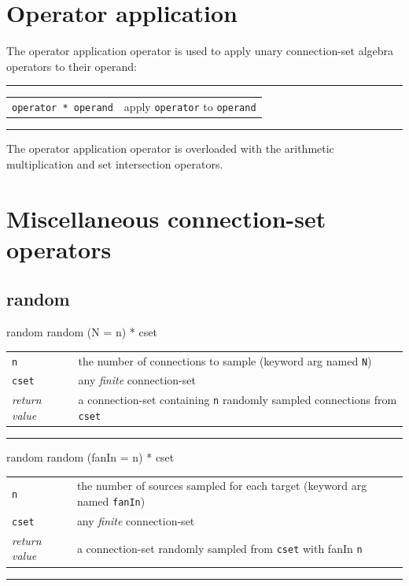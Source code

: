 \documentclass[a4paper,twoside]{report}
\makeatletter
\newenvironment{parameters}%
{\begin{tabular}{@{\hspace{2em}}lp{0.6\textwidth}}}%
{\end{tabular}\par\vspace{1mm}\par\hrule\par\vspace{5mm}}
\newcommand{\fa}[1]{\lstinline|#1|}
\newcommand{\expr}[1]{\lstinline|#1|}
\newcommand{\ret}{\emph{return value}}
\makeatother
\begin{document}
\section{Operator application}\label{sec:opap}
The operator application operator is used to apply unary
connection-set algebra operators to their operand:
\par\vspace{4mm}\hrule\par\vspace{1mm}
\begin{tabular}{@{\hspace{2em}}lp{}}
  \expr{operator * operand} & apply \fa{operator} to \fa{operand}\\
\end{tabular}\par\vspace{1mm}\par\hrule\par\vspace{5mm}
The operator application operator is overloaded with the arithmetic
multiplication and set intersection operators.

\section{Miscellaneous connection-set operators}\label{sec:miscop}

\subsection{random}\label{sec:randomop}
\begin{head}{random}
  random (N = n) * cset
\end{head}
\begin{parameters}
  \lstinline|n| &%
  the number of connections to sample (keyword arg named \fa{N})\\
  \fa{cset} &%
  any \emph{finite} connection-set\\
  \ret &%
  a connection-set containing \fa{n} randomly sampled connections from
  \fa{cset}\\
\end{parameters}

\begin{head}{random}
  random (fanIn = n) * cset
\end{head}
\begin{parameters}
  \lstinline|n| &%
  the number of sources sampled for each target (keyword arg named \fa{fanIn})\\
  \fa{cset} &%
  any \emph{finite} connection-set\\
  \ret &%
  a connection-set randomly sampled from \fa{cset} with fanIn \fa{n}\\
\end{parameters}
\end{document}
